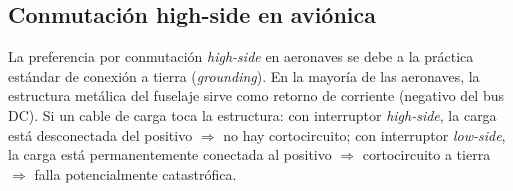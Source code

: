 \documentclass[11pt]{article}
\begin{document}
\subsection{Conmutación high-side en aviónica}
La preferencia por conmutación \emph{high-side} en aeronaves se debe a la práctica
estándar de conexión a tierra (\emph{grounding}). En la mayoría de las aeronaves, la
estructura metálica del fuselaje sirve como retorno de corriente (negativo del bus DC).
Si un cable de carga toca la estructura: con interruptor \emph{high-side}, la carga está
desconectada del positivo $\Rightarrow$ no hay cortocircuito; con interruptor
\emph{low-side}, la carga está permanentemente conectada al positivo $\Rightarrow$
cortocircuito a tierra $\Rightarrow$ falla potencialmente catastrófica.
\end{document}
